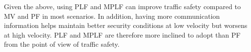 \documentclass[journal]{IEEEtran}
\begin{document}
Given the above, using PLF and MPLF can improve traffic safety compared to MV and PF in most scenarios. In addition, having more communication information helps maintain better security conditions at low velocity but worsens at high velocity. PLF and MPLF are therefore more inclined to adopt than PF from the point of view of traffic safety.




\end{document}
